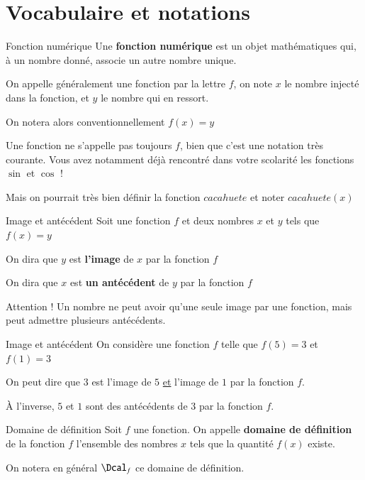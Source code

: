 \documentclass[oneside,12pt]{article}          %
\begin{document}
\section{Vocabulaire et notations}

\begin{definition}{Fonction numérique}
	Une \textbf{fonction numérique} est un objet mathématiques qui, à un nombre donné, associe un autre nombre unique.

	On appelle généralement une fonction par la lettre $f$, on note $x$ le nombre injecté dans la fonction, et $y$ le nombre qui en ressort.

	On notera alors conventionnellement $f(x)=y$
\end{definition}

\begin{remarque}
	Une fonction ne s'appelle pas toujours $f$, bien que c'est une notation très courante. Vous avez notamment déjà rencontré dans votre scolarité les fonctions $\sin$ et $\cos$ !
	
	Mais on pourrait très bien définir la fonction $cacahuete$ et noter $cacahuete(x)$
\end{remarque}



\begin{definition}{Image et antécédent}
	Soit une fonction $f$ et deux nombres $x$ et $y$ tels que $f(x) = y$
	
	On dira que $y$ est \textbf{l'image} de $x$ par la fonction $f$
	
	On dira que $x$ est \textbf{un antécédent} de $y$ par la fonction $f$
\end{definition}

\begin{remarque}
	Attention ! Un nombre ne peut avoir qu'une seule image par une fonction, mais peut admettre plusieurs antécédents.
\end{remarque}


\begin{exemple}{Image et antécédent}
	On considère une fonction $f$ telle que $f(5)=3$ et $f(1)=3$
	
	On peut dire que $3$ est l'image de $5$ \underline{et} l'image de $1$ par la fonction $f$.
	
	À l'inverse, $5$ et $1$ sont des antécédents de $3$ par la fonction $f$.
\end{exemple}


\begin{definition}{Domaine de définition}
	Soit $f$ une fonction. On appelle \textbf{domaine de définition} de la fonction $f$ l'ensemble des nombres $x$ tels que la quantité $f(x)$ existe.
	
	On notera en général $\Dcal_f$ ce domaine de définition.
\end{definition}
\end{document}
